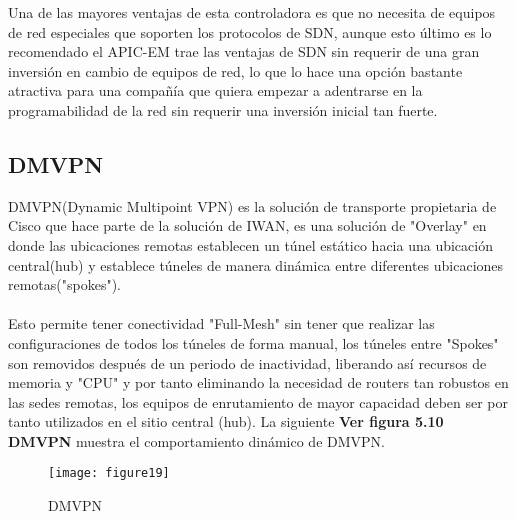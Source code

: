 Una de las mayores ventajas de esta controladora es que no necesita de equipos de red especiales que soporten los protocolos de SDN, aunque esto último es lo recomendado el APIC-EM trae las ventajas de SDN sin requerir de una gran inversión en cambio de equipos de red, lo que lo hace una opción bastante atractiva para una compañía que quiera empezar a adentrarse en la programabilidad de la red sin requerir una inversión inicial tan fuerte.


\subsection{DMVPN}
\label{sec:DMVPN}

DMVPN(Dynamic Multipoint VPN) es la solución de transporte propietaria de Cisco que hace parte de la solución de IWAN, es una solución de "Overlay" en donde las ubicaciones remotas establecen un túnel estático hacia una ubicación central(hub) y establece túneles de manera dinámica entre diferentes ubicaciones remotas("spokes").
\\
\\
Esto permite tener conectividad "Full-Mesh" sin tener que realizar las configuraciones de todos los túneles de forma manual, los túneles entre "Spokes" son removidos después de un periodo de inactividad, liberando así recursos de memoria y "CPU" y por tanto eliminando la necesidad de routers tan robustos en las sedes remotas, los equipos de enrutamiento de mayor capacidad deben ser por tanto utilizados en el sitio central (hub). La siguiente \textbf{Ver figura 5.10 DMVPN} muestra el comportamiento dinámico de DMVPN.
\begin{figure}[htbp]
  \centering
    {\texttt{[image: figure19]}}%
  \caption{DMVPN}
  \label{fig:fig2subfig}
\end{figure}


